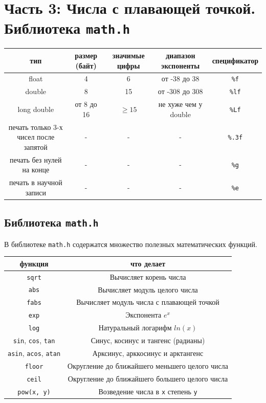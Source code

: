 \documentclass{article}
\begin{document}
\newpage
\section*{Часть 3: Числа с плавающей точкой. Библиотека \texttt{math.h}}
\begin{center}
\begin{tabular}{ c c c c c }
 тип & размер (байт) & значимые цифры & диапазон экспоненты & спецификатор \\ \hline
 float             & 4          & 6  & от -38 до 38    & \texttt{\%f} \\ 
 double            & 8          & 15 & от -308 до 308  & \texttt{\%lf}  \\  
 long double       & от 8 до 16 & $\ge 15$  & не хуже чем у double  & \texttt{\%Lf}  \\ \hline
 печать только 3-х чисел после запятой & -          & -  & -              & \texttt{\%.3f} \\
 печать без нулей на конце & -          & -  & -              & \texttt{\%g} \\
 печать в научной записи   & -          & -  & -              & \texttt{\%e} \\
\end{tabular}
\end{center}


\subsection*{Библиотека \texttt{math.h}}
В библиотеке \texttt{math.h} содержатся множество полезных математических функций.

\begin{center}
\begin{tabular}{ c c }
 функция & что делает \\ \hline
 \texttt{sqrt}     & Вычисляет корень числа \\ 
 \texttt{abs}      & Вычисляет модуль целого числа \\ 
 \texttt{fabs}     & Вычисляет модуль числа с плавающей точкой \\ 
 \texttt{exp}      & Экспонента $e^x$ \\ 
 \texttt{log}      & Натуральный логарифм $ln(x)$ \\
 \texttt{sin}, \texttt{cos},  \texttt{tan} & Синус, косинус и тангенс (радианы) \\ 
 \texttt{asin}, \texttt{acos},  \texttt{atan} & Арксинус, арккосинус и арктангенс \\ 
 \texttt{floor}      & Округление до ближайшего меньшего целого числа \\
 \texttt{ceil}       & Округление до ближайшего большего целого числа \\
 \texttt{pow(x, y)}        & Возведение числа в \texttt{x} степень \texttt{y} \\
\end{tabular}
\end{center}
\end{document}

